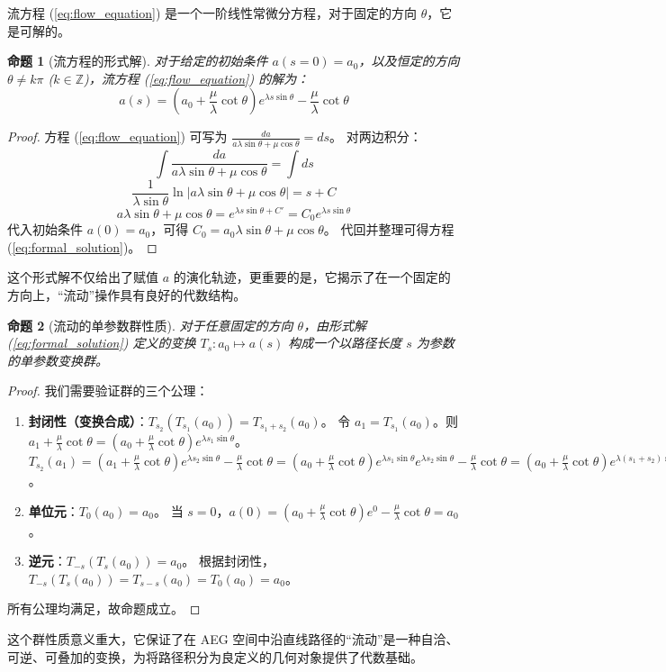 \documentclass[a4paper,12pt]{book}
\numberwithin{problem}{section}
\numberwithin{definition}{section}
\numberwithin{lemma}{section}
\newtheorem{proposition}{命题}
\numberwithin{proposition}{section}
\numberwithin{theorem}{section}
\numberwithin{grammar}{section}
\numberwithin{program}{section}
\numberwithin{convention}{section}
\numberwithin{corollary}{section}
\begin{document}
流方程 (\ref{eq:flow_equation}) 是一个一阶线性常微分方程，对于固定的方向 $\theta$，它是可解的。

\begin{proposition}[流方程的形式解]
    \label{prop:formal_solution}
    对于给定的初始条件 $a(s=0)=a_0$，以及恒定的方向 $\theta \neq k\pi$ ($k \in \mathbb{Z}$)，流方程 (\ref{eq:flow_equation}) 的解为：
    \begin{equation}
        a(s) = \left(a_0 + \frac{\mu}{\lambda} \cot\theta\right) e^{\lambda s \sin\theta} - \frac{\mu}{\lambda} \cot\theta
        \label{eq:formal_solution}
    \end{equation}
\end{proposition}
\begin{proof}
    方程 (\ref{eq:flow_equation}) 可写为 $\frac{da}{a\lambda\sin\theta + \mu\cos\theta} = ds$。
    对两边积分：
    \[ \int \frac{da}{a\lambda\sin\theta + \mu\cos\theta} = \int ds \]
    \[ \frac{1}{\lambda\sin\theta} \ln|a\lambda\sin\theta + \mu\cos\theta| = s + C \]
    \[ a\lambda\sin\theta + \mu\cos\theta = e^{\lambda s \sin\theta + C'} = C_0 e^{\lambda s \sin\theta} \]
    代入初始条件 $a(0)=a_0$，可得 $C_0 = a_0\lambda\sin\theta + \mu\cos\theta$。
    代回并整理可得方程 (\ref{eq:formal_solution})。
\end{proof}

这个形式解不仅给出了赋值 $a$ 的演化轨迹，更重要的是，它揭示了在一个固定的方向上，“流动”操作具有良好的代数结构。

\begin{proposition}[流动的单参数群性质]
    \label{prop:one_parameter_group}
    对于任意固定的方向 $\theta$，由形式解 (\ref{eq:formal_solution}) 定义的变换 $T_s: a_0 \mapsto a(s)$ 构成一个以路径长度 $s$ 为参数的单参数变换群。
\end{proposition}
\begin{proof}
    我们需要验证群的三个公理：
    \begin{enumerate}
        \item \textbf{封闭性（变换合成）}：$T_{s_2}(T_{s_1}(a_0)) = T_{s_1+s_2}(a_0)$。
        令 $a_1 = T_{s_1}(a_0)$。则 $a_1 + \frac{\mu}{\lambda}\cot\theta = (a_0 + \frac{\mu}{\lambda}\cot\theta)e^{\lambda s_1 \sin\theta}$。
        $T_{s_2}(a_1) = (a_1 + \frac{\mu}{\lambda}\cot\theta)e^{\lambda s_2 \sin\theta} - \frac{\mu}{\lambda}\cot\theta = (a_0 + \frac{\mu}{\lambda}\cot\theta)e^{\lambda s_1 \sin\theta}e^{\lambda s_2 \sin\theta} - \frac{\mu}{\lambda}\cot\theta = (a_0 + \frac{\mu}{\lambda}\cot\theta)e^{\lambda (s_1+s_2) \sin\theta} - \frac{\mu}{\lambda}\cot\theta = T_{s_1+s_2}(a_0)$。
        \item \textbf{单位元}：$T_0(a_0) = a_0$。
        当 $s=0$，$a(0) = (a_0 + \frac{\mu}{\lambda}\cot\theta)e^0 - \frac{\mu}{\lambda}\cot\theta = a_0$。
        \item \textbf{逆元}：$T_{-s}(T_s(a_0)) = a_0$。
        根据封闭性，$T_{-s}(T_s(a_0)) = T_{s-s}(a_0) = T_0(a_0) = a_0$。
    \end{enumerate}
    所有公理均满足，故命题成立。
\end{proof}
这个群性质意义重大，它保证了在 AEG 空间中沿直线路径的“流动”是一种自洽、可逆、可叠加的变换，为将路径积分为良定义的几何对象提供了代数基础。
\end{document}
